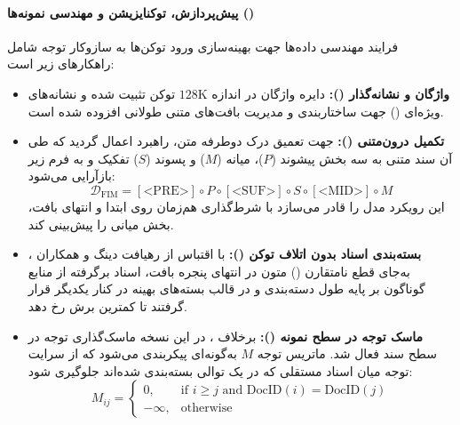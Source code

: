 \paragraph*{پیش‌پردازش، توکنایزیشن و مهندسی نمونه‌ها ()}
فرایند مهندسی داده‌ها جهت بهینه‌سازی ورود توکن‌ها به سازوکار توجه شامل راهکارهای زیر است:
\begin{itemize}
    \item \textbf{واژگان و نشانه‌گذار ():} دایره واژگان در اندازه $128\text{K}$ توکن تثبیت شده و نشانه‌های ویژه‌ای () جهت ساختاربندی و مدیریت بافت‌های متنی طولانی افزوده شده است.
    \item \textbf{تکمیل درون‌متنی ():} جهت تعمیق درک دوطرفه متن، راهبرد  \cite{deepseek2024v3} اعمال گردید که طی آن سند متنی به سه بخش پیشوند ($P$)، میانه ($M$) و پسوند ($S$) تفکیک و به فرم زیر بازآرایی می‌شود:
    \begin{equation}
        \mathcal{D}_{\text{FIM}} = [\text{<PRE>}] \circ P \circ [\text{<SUF>}] \circ S \circ [\text{<MID>}] \circ M
    \end{equation}
    این رویکرد مدل را قادر می‌سازد با شرط‌گذاری هم‌زمان روی ابتدا و انتهای بافت، بخش میانی را پیش‌بینی کند.
    \item \textbf{بسته‌بندی اسناد بدون اتلاف توکن ():} با اقتباس از رهیافت دینگ و همکاران \cite{ding2024fewer}، به‌جای قطع نامتقارن () متون در انتهای پنجره بافت، اسناد برگرفته از منابع گوناگون بر پایه طول دسته‌بندی و در قالب بسته‌های بهینه در کنار یکدیگر قرار گرفتند تا کمترین برش رخ دهد.
    \item \textbf{ماسک توجه در سطح نمونه ():} برخلاف ، در این نسخه ماسک‌گذاری توجه در سطح سند فعال شد. ماتریس توجه $M$ به‌گونه‌ای پیکربندی می‌شود که از سرایت توجه میان اسناد مستقلی که در یک توالی بسته‌بندی شده‌اند جلوگیری شود:
    \begin{equation}
        M_{ij} = \begin{cases} 
            0, & \text{if } i \ge j \text{ and } \text{DocID}(i) = \text{DocID}(j) \\ 
            -\infty, & \text{otherwise} 
        \end{cases}
    \end{equation}
\end{itemize}

